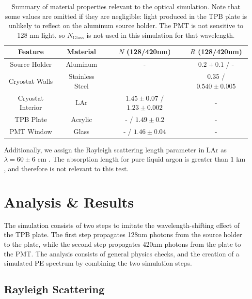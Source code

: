 \documentclass[aps,pra,notitlepage,groupedaddress]{revtex4-1}
\begin{document}
\begin{table}
	\begin{center}
		\begin{tabular}{| c | c | c | c |}
			\hline
			Feature & Material & $N$ (128/420nm) & $R$ (128/420nm) \\
			\hline
			Source Holder & Aluminum & - & $0.2 \pm 0.1$ \cite{johnson_1968} / - \\
			Cryostat Walls & Stainless Steel & - & 0.35 / $0.540 \pm 0.005$ \cite{nasa} \\
			Cryostat Interior & LAr & $1.45 \pm 0.07$ \cite{grace_butcher_monroe_nikkel_2017} / $1.23 \pm 0.002$ \cite{sinnock_smith_1969} & -\\
			TPB Plate & Acrylic & - / $1.49 \pm 0.2$ \cite{sinnock_smith_1969} & - \\
			PMT Window & Glass & - / $1.46 \pm 0.04$ \cite{malitson_1965}& - \\
			\hline
		\end{tabular}
		\caption{Summary of material properties relevant to the optical simulation. Note that some values are omitted if they are negligible: light produced in the TPB plate is unlikely to reflect on the aluminum source holder. The PMT is not sensitive to 128 nm light, so $N_{\text{Glass}}$ is not used in this simulation for that wavelength. \label{tab:mats}}
	\end{center}
\end{table}

Additionally, we assign the Rayleigh scattering length parameter in LAr as $\lambda=60 \pm 6$ cm \cite{grace_butcher_monroe_nikkel_2017}. The absorption length for pure liquid argon is greater than 1 km \cite{jones_chiu_conrad_ignarra_katori_toups_2013}, and therefore is not relevant to this test.

\section{Analysis \& Results}

The simulation consists of two steps to imitate the wavelength-shifting effect of the TPB plate. The first step propagates 128nm photons from the source holder to the plate, while the second step propagates 420nm photons from the plate to the PMT. The analysis consists of general physics checks, and the creation of a simulated PE spectrum by combining the two simulation steps.

\subsection{Rayleigh Scattering}
\end{document}
